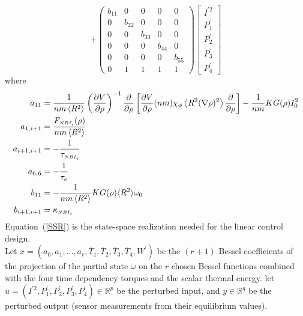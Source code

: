 \documentclass[12pt,lot, lof]{puthesis}
\begin{document}
  \begin{equation}
  + \left(\! \begin{array}{ccccc} b_{11}  & 0 & 0&0 & 0 \\ 0 & b_{22}& 0& 0& 0 \\ 0 & 0& b_{33}& 0& 0 \\ 0 & 0& 0& b_{44}& 0 \\ 0 & 0& 0& 0& b_{55}  \\0 & 1 & 1 &1 &1  \end{array}  \!\right) \left[\! \begin{array}{c}  I^{'2} \\ P^{'}_1 \\ P^{'}_2 \\ P^{'}_3 \\ P^{'}_4  \end{array}\!\right]
\label{SSR}
\end{equation}
 where
 \begin{align}
 a_{11} &=  \frac{1}{n m \left<R^2\right>}  \left( \frac{\partial V}{\partial\rho}\right)^{-1}
   \frac{\partial}{\partial \rho} 
   \left[\frac{\partial V}{\partial \rho}(n m)\chi_\phi 
   \left< R^2 (\nabla \rho)^2\right> 
   \frac{\partial}{\partial\rho}\right]   
   -  \frac{1}{n m} K G(\rho)   I^2_0  \nonumber\\
 a_{1,{i+1}} &=  \frac{ F_\textrm{\tiny{$NBI_i$}}(\rho) }{n m \left<R^2\right>}\nonumber \\
 a_{{i+1},{i+1}} &= - \frac{1}{\tau_\textrm{\tiny{$NBI_i$}}}  \nonumber \\  
  a_{{6},6} &= - \frac{1}{\tau_e} \nonumber \\
 b_{11} &= - \frac{1}{n m \left<R^2\right>} K G(\rho) \langle R^2 \rangle  \omega_0 \nonumber \\
 b_{{i+1},{i+1}} &= \kappa_\textrm{\tiny{$NBI_i$}} \nonumber
 \end{align}
Equation~(\ref{SSR}) is the state-space realization needed for the linear control design.\\
%
Let $x = \left( a_{0}, a_{1}, ..., a_{r} , \overline{T}_1, \overline{T}_2, \overline{T}_3, \overline{T}_4, W^{'} \right)$ be the $(r+1)$ Bessel coefficients of the projection of the partial state $ \omega$ on the $r$ chosen Bessel functions combined with the four time dependency torques and the scalar thermal energy.
let $u = (  {I^{'2}}, P^{'}_1,P^{'}_2, P^{'}_3, P^{'}_4 ) \in \mathbb{R}^p$ be the perturbed input,
and $y \in \mathbb{R}^q$ be the perturbed output (sensor measurements from their equilibrium values).
\end{document}
